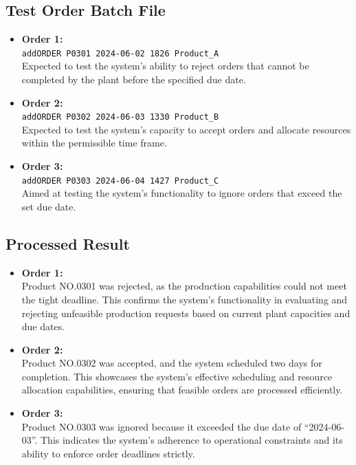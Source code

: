 \documentclass[conference]{IEEEtran}
\begin{document}
\subsection{Test Order Batch File}
\begin{itemize}
    \item \textbf{Order 1:} \\
    \texttt{addORDER P0301 2024-06-02 1826 Product\_A} \\
    Expected to test the system's ability to reject orders that cannot be completed by the plant before the specified due date.
    \item \textbf{Order 2:} \\
    \texttt{addORDER P0302 2024-06-03 1330 Product\_B} \\
    Expected to test the system's capacity to accept orders and allocate resources within the permissible time frame.
    \item \textbf{Order 3:} \\
    \texttt{addORDER P0303 2024-06-04 1427 Product\_C} \\
    Aimed at testing the system's functionality to ignore orders that exceed the set due date.
\end{itemize}
\subsection{Processed Result}
\begin{itemize}
    \item \textbf{Order 1:} \\
    Product NO.0301 was rejected, as the production capabilities could not meet the tight deadline. This confirms the system's functionality in evaluating and rejecting unfeasible production requests based on current plant capacities and due dates.
    \item \textbf{Order 2:} \\
    Product NO.0302 was accepted, and the system scheduled two days for completion. This showcases the system's effective scheduling and resource allocation capabilities, ensuring that feasible orders are processed efficiently.
    \item \textbf{Order 3:} \\
    Product NO.0303 was ignored because it exceeded the due date of “2024-06-03”. This indicates the system's adherence to operational constraints and its ability to enforce order deadlines strictly.
\end{itemize}
\end{document}
